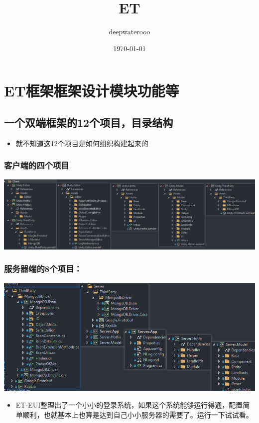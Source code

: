 \documentclass[9pt, b5paper]{article}
\author{deepwaterooo}
\date{\today}
\title{ET}
\begin{document}
\maketitle
\tableofcontents


\section{ET框架框架设计模块功能等}
\label{sec-1}
\subsection{一个双端框架的12个项目，目录结构}
\label{sec-1-1}
\begin{itemize}
\item 就不知道这12个项目是如何组织构建起来的
\end{itemize}
\subsubsection{客户端的四个项目}
\label{sec-1-1-1}

\includegraphics[width=.9\linewidth]{./pic/readme_20230201_200218.png}
\subsubsection{服务器端的8个项目：}
\label{sec-1-1-2}

\includegraphics[width=.9\linewidth]{./pic/readme_20230201_201117.png}
\begin{itemize}
\item ET-EUI整理出了一个小小的登录系统，如果这个系统能够运行得通，配置简单顺利，也就基本上也算是达到自己小小服务器的需要了。运行一下试试看。
\end{itemize}
\end{document}
